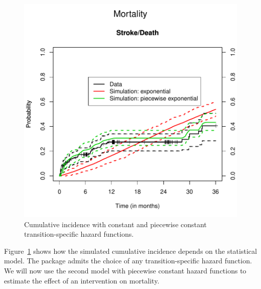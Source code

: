 \begin{figure}
\begin{center}
\includegraphics{PDF/Application-PWexpPlot}
\end{center}
\caption{Cumulative incidence with constant and piecewise constant transition-specific hazard functions.}
\label{fig:PWexpPlot}
\end{figure}

Figure~\ref{fig:PWexpPlot} shows how the simulated cumulative incidence depends on the statistical model. The package  admits the choice of any transition-specific hazard function. 
We will now use the second model with piecewise constant hazard functions to estimate the effect of an intervention on mortality.


